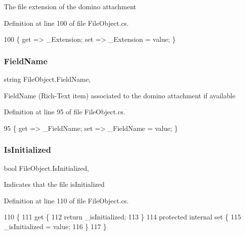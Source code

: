 The file extension of the domino attachment 



Definition at line 100 of file File\+Object.\+cs.


\begin{DoxyCode}
100 \{ \textcolor{keyword}{get} => \_Extension; \textcolor{keyword}{set} => \_Extension = value; \}
\end{DoxyCode}
\mbox{\label{class_file_object_a26fa0ac628fee2387b7f89c78f93842e}} 
\subsubsection{\texorpdfstring{Field\+Name}{FieldName}}
{\footnotesize\ttfamily string File\+Object.\+Field\+Name\hspace{0.3cm}{\ttfamily [get]}, {\ttfamily [set]}}



Field\+Name (Rich-\/\+Text item) associated to the domino attachment if available 



Definition at line 95 of file File\+Object.\+cs.


\begin{DoxyCode}
95 \{ \textcolor{keyword}{get} => \_FieldName; \textcolor{keyword}{set} => \_FieldName = value; \}
\end{DoxyCode}
\mbox{\label{class_file_object_a36ff6c07d0662885402bfe7d98cf2988}} 
\subsubsection{\texorpdfstring{Is\+Initialized}{IsInitialized}}
{\footnotesize\ttfamily bool File\+Object.\+Is\+Initialized\hspace{0.3cm}{\ttfamily [get]}, {\ttfamily [set]}}



Indicates that the file is\+Initialized 



Definition at line 110 of file File\+Object.\+cs.


\begin{DoxyCode}
110                               \{
111         \textcolor{keyword}{get} \{
112             \textcolor{keywordflow}{return} \_isInitialized;
113         \}
114         \textcolor{keyword}{protected} \textcolor{keyword}{internal} \textcolor{keyword}{set} \{
115             \_isInitialized = value;
116         \}
117     \}
\end{DoxyCode}
\mbox{\label{class_file_object_a9d47aff166393cb47490da2661576d62}} 
